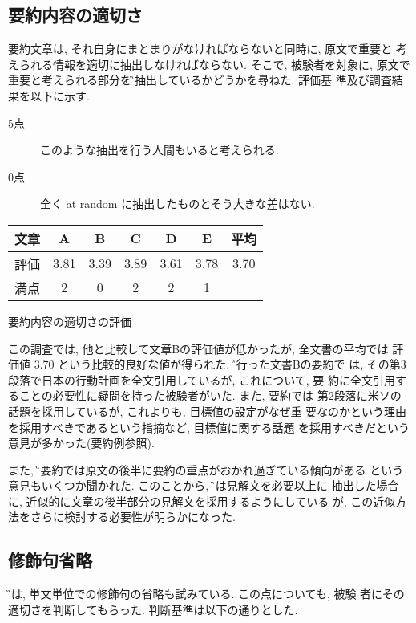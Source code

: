 \subsection{要約内容の適切さ}
要約文章は, それ自身にまとまりがなければならないと同時に, 原文で重要と
考えられる情報を適切に抽出しなければならない. そこで, 被験者を対象に, 
原文で重要と考えられる部分を\G で抽出しているかどうかを尋ねた. 評価基
準及び調査結果を以下に示す. \vspace*{-0.1mm}

\begin{description}
\item[5点]このような抽出を行う人間もいると考えられる. \vspace*{-0.1mm}
\item[0点]全く at random に抽出したものとそう大きな差はない. \vspace*{-0.1mm}
\end{description}

\begin{center}
\begin{tabular}{|c||c|c|c|c|c||c|}
\hline
文章 & A & B & C & D & E & 平均 \\
\hline
評価 & 3.81 & 3.39 & 3.89 & 3.61 & 3.78 & 3.70 \\
満点 & 2 & 0 & 2 & 2 & 1 & \\
\hline
\end{tabular}
\caption{要約内容の適切さの評価}
\vspace*{-0.2mm}
\end{center}

この調査では, 他と比較して文章Bの評価値が低かったが, 全文書の平均では
評価値 3.70 という比較的良好な値が得られた. \G の行った文書Bの要約で
は, その第3段落で日本の行動計画を全文引用しているが, これについて, 要
約に全文引用することの必要性に疑問を持った被験者がいた. また, 要約では
第2段落に米ソの話題を採用しているが, これよりも, 目標値の設定がなぜ重
要なのかという理由を採用すべきであるという指摘など, 目標値に関する話題
を採用すべきだという意見が多かった(要約例参照). 

また, \G の要約では原文の後半に要約の重点がおかれ過ぎている傾向がある
という意見もいくつか聞かれた. このことから, \G では見解文を必要以上に
抽出した場合に, 近似的に文章の後半部分の見解文を採用するようにしている
が, この近似方法をさらに検討する必要性が明らかになった. 

\subsection{修飾句省略}
 \G では, 単文単位での修飾句の省略も試みている. この点についても, 被験
者にその適切さを判断してもらった. 判断基準は以下の通りとした. 

